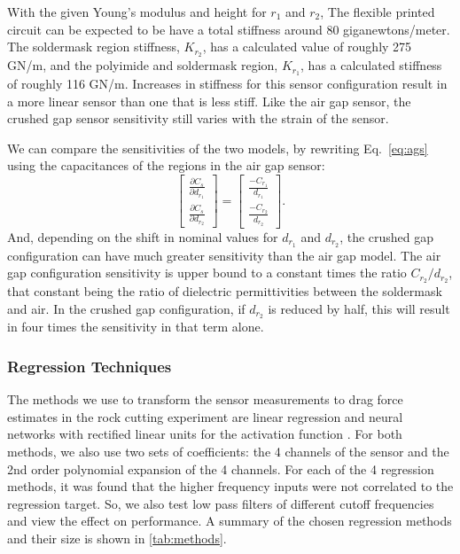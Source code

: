 With the given Young's modulus and height for $r_1$ and $r_2$, The flexible printed circuit 
can be expected to be have a total stiffness around 80 giganewtons/meter. 
The soldermask region stiffness, $K_{r_2}$, has a calculated value of roughly 275 GN/m, and
the polyimide and soldermask region, $K_{r_1}$, has a calculated stiffness of roughly 116 GN/m.
Increases in stiffness for this sensor configuration result in a more linear sensor than one that is less stiff.
Like the air gap sensor, the crushed gap sensor sensitivity still varies with the strain of the sensor.

We can compare the sensitivities of the two models, by rewriting Eq.~\ref{eq:ags}
using the capacitances of the regions in the air gap sensor:
\begin{equation}
\begin{bmatrix}
\frac{\partial C_s}{\partial d_{r_1}} \\[1em]
\frac{\partial C_s}{\partial d_{r_2}} \end{bmatrix} = 
\begin{bmatrix}
\frac{-C_{r_1}}{d_{r_1}} \\[1em]
\frac{-C_{r_2}}{d_{r_2}}
\end{bmatrix}.
\end{equation}
And, depending on the shift in nominal values for $d_{r_1}$ and $d_{r_2}$, the crushed gap configuration 
can have much greater sensitivity than the air gap model. 
The air gap configuration sensitivity is upper bound to a constant times the ratio $C_{r_2} / d_{r_2}$, 
that constant being the ratio of dielectric permittivities between the soldermask and air.
In the crushed gap configuration, if $d_{r_2}$ is reduced by half, this will result in four times
the sensitivity in that term alone.

\subsubsection{Regression Techniques \label{sub:reg}}

The methods we use to transform the sensor measurements to drag force estimates 
in the rock cutting experiment are linear regression \cite{Maulud2020} 
and neural networks with rectified linear units for the activation function \cite{Hu2019, Hara2015}. 
For both methods, we also use two sets of coefficients: the 4 channels of the sensor 
and the 2nd order polynomial expansion of the 4 channels. 
For each of the 4 regression methods, it was found that 
the higher frequency inputs were not correlated to the regression target.
So, we also test low pass filters of different 
cutoff frequencies and view the effect on performance. 
A summary of the chosen regression methods and their size is shown in \ref{tab:methods}.

